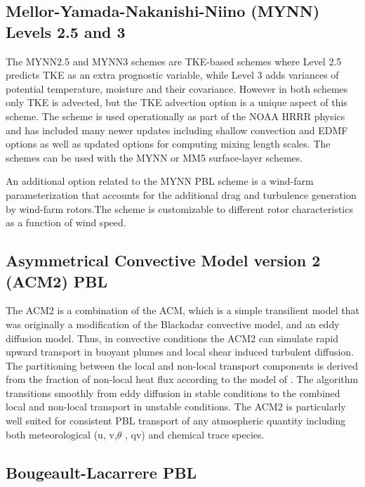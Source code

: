 \subsection{Mellor-Yamada-Nakanishi-Niino (MYNN) Levels 2.5 and 3}

The MYNN2.5 and MYNN3 schemes \citep{nakanishi06,nakanishi09} are TKE-based schemes where Level 2.5 predicts
TKE as an extra prognostic variable, while Level 3 adds variances of potential temperature, moisture and their covariance.
However in both schemes only TKE is advected, but the TKE advection option is a unique aspect of this scheme. The scheme is
used operationally as part of the NOAA HRRR physics and has included many newer updates including shallow convection
and EDMF options \citep{olson19} as well as updated options for computing mixing length scales. The schemes can be used
with the MYNN or MM5 surface-layer schemes.

An additional option related to the MYNN PBL scheme is a wind-farm parameterization \citep{fitch12} that accounts for
the additional drag and turbulence generation by wind-farm rotors.The scheme is customizable to different rotor characteristics
as a function of wind speed.

\subsection{Asymmetrical Convective Model version 2 (ACM2) PBL}

The ACM2 \citep{pleim07} is a combination of the ACM, which is a simple transilient model that was originally a modification of the Blackadar convective model, and an eddy diffusion model.  Thus, in convective conditions the ACM2 can simulate rapid upward transport in buoyant plumes and local shear induced turbulent diffusion.  The partitioning between the local and non-local transport components is derived from the fraction of non-local heat flux according to the model of \citet{holtslag93}.  The algorithm transitions smoothly from eddy diffusion in stable conditions to the combined local and non-local transport in unstable conditions.  The ACM2 is particularly well suited for consistent PBL transport of any atmospheric quantity including both meteorological (u, v,$\theta$ , qv) and chemical trace species.

\subsection{Bougeault-Lacarrere PBL}

